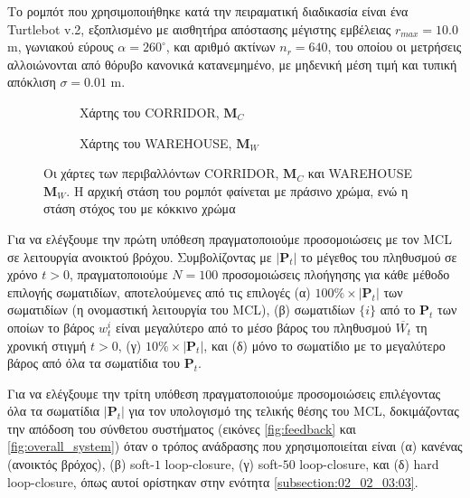 Το ρομπότ που χρησιμοποιήθηκε κατά την πειραματική διαδικασία είναι ένα
Turtlebot v.2, εξοπλισμένο με αισθητήρα απόστασης μέγιστης εμβέλειας
$r_{max} = 10.0$ m, γωνιακού εύρους $\alpha = 260^{\circ}$, και αριθμό ακτίνων
$n_r = 640$, του οποίου οι μετρήσεις αλλοιώνονται από θόρυβο κανονικά
κατανεμημένο, με μηδενική μέση τιμή και τυπική απόκλιση $\sigma = 0.01$ m.

\begin{figure}[h]\hspace{0.5cm}
  \begin{subfigure}{0.49\linewidth}\centering
    \vspace{1.0cm}
    
    \vspace{1.0cm}
    \caption{\small Χάρτης του CORRIDOR, $\bm{M}_C$}
    \label{fig:02_02_04:map_corridor}
  \end{subfigure}\hfill
  \begin{subfigure}{0.49\linewidth} \centering
    
    \vspace{0.25cm}
    \caption{\small Χάρτης του WAREHOUSE, $\bm{M}_W$}
    \label{fig:02_02_04:map_warehouse}
  \end{subfigure}
  \caption{\small Οι χάρτες των περιβαλλόντων CORRIDOR, $\bm{M}_C$ και
           WAREHOUSE $\bm{M}_W$. Η αρχική στάση του ρομπότ φαίνεται με πράσινο
           χρώμα, ενώ η στάση στόχος του με κόκκινο χρώμα}
\label{fig:02_02_04:maps}
\end{figure}

Για να ελέγξουμε την πρώτη υπόθεση πραγματοποιούμε προσομοιώσεις με τον MCL σε
λειτουργία ανοικτού βρόχου. Συμβολίζοντας με $|\bm{P}_t|$ το μέγεθος του
πληθυσμού σε χρόνο $t>0$, πραγματοποιούμε $N=100$ προσομοιώσεις πλοήγησης για
κάθε μέθοδο επιλογής σωματιδίων, αποτελούμενες από τις επιλογές (α) $100\%
\times |\bm{P}_t|$ των σωματιδίων (η ονομαστική λειτουργία του MCL), (β)
σωματιδίων $\{i\}$ από το $\bm{P}_t$ των οποίων το βάρος $w_t^i$ είναι
μεγαλύτερο από το μέσο βάρος του πληθυσμού $\overline{W_t}$ τη χρονική στιγμή
$t>0$, (γ) $10\% \times |\bm{P}_t|$, και (δ) μόνο το σωματίδιο με το μεγαλύτερο
βάρος από όλα τα σωματίδια του $\bm{P}_t$.

Για να ελέγξουμε την τρίτη υπόθεση πραγματοποιούμε προσομοιώσεις επιλέγοντας
όλα τα σωματίδια $|\bm{P}_t|$ για τον υπολογισμό της τελικής θέσης του MCL,
δοκιμάζοντας την απόδοση του σύνθετου συστήματος (εικόνες \ref{fig:feedback} και
\ref{fig:overall_system}) όταν ο τρόπος ανάδρασης που
χρησιμοποιείται είναι (α) κανένας (ανοικτός βρόχος), (β) soft-$1$ loop-closure,
(γ) soft-$50$ loop-closure, και (δ) hard loop-closure, όπως αυτοί ορίστηκαν
στην ενότητα \ref{subsection:02_02_03:03}.

